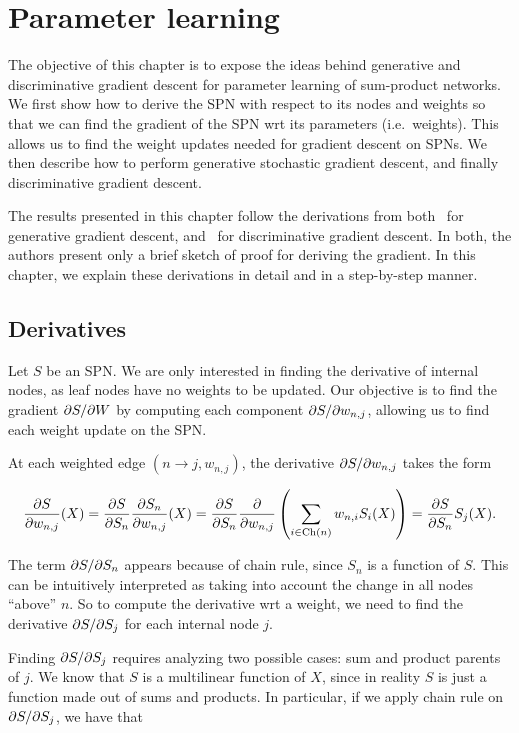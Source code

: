 \chapter{Parameter learning}\label{chp:weights}

The objective of this chapter is to expose the ideas behind generative and discriminative gradient
descent for parameter learning of sum-product networks. We first show how to derive the SPN with
respect to its nodes and weights so that we can find the gradient of the SPN wrt its parameters
(i.e.\ weights). This allows us to find the weight updates needed for gradient descent on SPNs. We
then describe how to perform generative stochastic gradient descent, and finally discriminative
gradient descent.

The results presented in this chapter follow the derivations from both~\cite{poon-domingos} for
generative gradient descent, and~\cite{discriminative} for discriminative gradient descent. In
both, the authors present only a brief sketch of proof for deriving the gradient. In this chapter,
we explain these derivations in detail and in a step-by-step manner.

\section{Derivatives}

Let $S$ be an SPN\@. We are only interested in finding the derivative of internal nodes, as leaf
nodes have no weights to be updated. Our objective is to find the gradient $\partial S/\partial W$ by
computing each component $\partial S/\partial w_{n,j}$, allowing us to find each weight update on the
SPN\@.

At each weighted edge $(n\to j, w_{n,j})$, the derivative $\partial S/\partial w_{n,j}$ takes the form

\begin{equation}
  \frac{\partial S}{\partial w_{n,j}}(X)=\frac{\partial S}{\partial S_n}\frac{\partial S_n}{\partial w_{n,j}}(X)=
    \frac{\partial S}{\partial S_n}\frac{\partial}{\partial w_{n,j}}\left(\sum_{i\in\operatorname*{\text{Ch}}(n)}w_{n,i}S_i(X)\right)=
    \frac{\partial S}{\partial S_n}S_j(X).
\end{equation}

The term $\partial S/\partial S_n$ appears because of chain rule, since $S_n$ is a function of $S$. This
can be intuitively interpreted as taking into account the change in all nodes ``above'' $n$. So to
compute the derivative wrt a weight, we need to find the derivative $\partial S/\partial S_j$ for each
internal node $j$.

Finding $\partial S/\partial S_j$ requires analyzing two possible cases: sum and product parents of $j$.
We know that $S$ is a multilinear function of $X$, since in reality $S$ is just a function made out
of sums and products. In particular, if we apply chain rule on $\partial S/\partial S_j$, we have that

